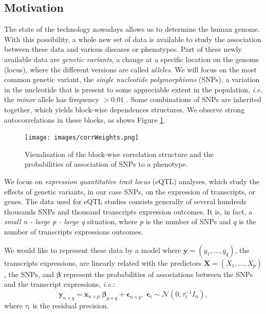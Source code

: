 \documentclass{article}
\numberwithin{equation}{section}
\begin{document}
\subsection{Motivation}
The state of the technology nowadays allows us to determine the human genome. With this possibility, a whole new set of data is available to study the association between these data and various diseases or phenotypes.  Part of these newly available data are \textit{genetic variants}, a change at a specific location on  the genome (locus), where the different versions are called \textit{alleles}. We will focus on the most common genetic variant, the \textit{single nucleotide polymorphisms} (SNPs), a variation in the nucleotide that is present to some appreciable extent in the population, \textit{i.e.} the \textit{minor} allele has frequency $> 0.01$ \cite{lewin}. Some combinations of SNPs are inherited together, which yields block-wise dependences structures. We observe strong autocorrelations in these blocks, as shows Figure \ref{fig:corr}.
\begin{figure}
\centering
\texttt{[image: images/corrWeights.png]}
\caption{\label{fig:corr} Visualisation of the block-wise correlation structure and the probabilities of association of SNPs to a phenotype.}
\end{figure}

We focus on \textit{expression quantitative trait locus} (eQTL) analyses, which study the effects of genetic variants, in our case SNPs, on the expression of transcripts, or genes. The data used for eQTL studies consists generally of several hundreds thousands SNPs and thousand transcripts expression outcomes. It is, in fact, a \textit{small n - large p - large q} situation, where $p$ is the number of SNPs and $q$ is the number of transcripts expressions outcomes.

We would like to represent these data by a model where $\boldsymbol{y} = (y_1, \ldots ,y_q)$, the transcripts expressions, are linearly related with the predictors $\boldsymbol{X} = (X_1, \ldots, X_p)$, the SNPs, and $\boldsymbol{\beta}$ represent the probabilities of associations between the SNPs and the transcript expressions, \textit{i.e.}:
\begin{equation*}
\boldsymbol{y}_{n\times q} = \boldsymbol{x}_{n \times p}\;\boldsymbol{\beta}_{p \times q}+\boldsymbol{\epsilon}_{n \times q},\;\boldsymbol{\epsilon}_t \sim \mathcal{N}(0,\tau_t^{-1}I_n),
\end{equation*}
where $\tau_t$ is the residual precision.
\end{document}

